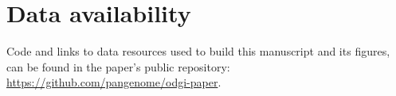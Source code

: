 \documentclass{bioinfo}
\begin{document}
\section*{Data availability}

Code and links to data resources used to build this manuscript and its figures, can be found in the paper's public repository: \url{https://github.com/pangenome/odgi-paper}.



%
%
%
%
%
%
%











\end{document}

